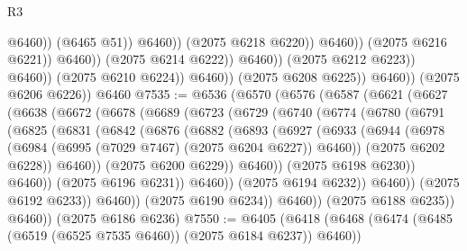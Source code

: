 \begin{lexlean}{R3}
\begin{coremodule}
                                                    @6460))
                                                (@6465 @51))
                                              @6460))
                                          (@2075 @6218 @6220))
                                        @6460))
                                    (@2075 @6216 @6221))
                                  @6460))
                              (@2075 @6214 @6222))
                            @6460))
                        (@2075 @6212 @6223))
                      @6460))
                  (@2075 @6210 @6224))
                @6460))
            (@2075 @6208 @6225))
          @6460))
      (@2075 @6206 @6226))
    @6460
@7535 := @6536
    (@6570
      (@6576
        (@6587
          (@6621
            (@6627
              (@6638
                (@6672
                  (@6678
                    (@6689
                      (@6723
                        (@6729
                          (@6740
                            (@6774
                              (@6780
                                (@6791
                                  (@6825
                                    (@6831
                                      (@6842
                                        (@6876
                                          (@6882
                                            (@6893
                                              (@6927
                                                (@6933
                                                  (@6944
                                                    (@6978
                                                      (@6984
                                                        (@6995 (@7029 @7467) (@2075 @6204 @6227))
                                                        @6460))
                                                    (@2075 @6202 @6228))
                                                  @6460))
                                              (@2075 @6200 @6229))
                                            @6460))
                                        (@2075 @6198 @6230))
                                      @6460))
                                  (@2075 @6196 @6231))
                                @6460))
                            (@2075 @6194 @6232))
                          @6460))
                      (@2075 @6192 @6233))
                    @6460))
                (@2075 @6190 @6234))
              @6460))
          (@2075 @6188 @6235))
        @6460))
    (@2075 @6186 @6236)
@7550 := @6405
    (@6418
      (@6468 (@6474 (@6485 (@6519 (@6525 @7535 @6460)) (@2075 @6184 @6237)) @6460))

\end{coremodule}
\end{lexlean}
